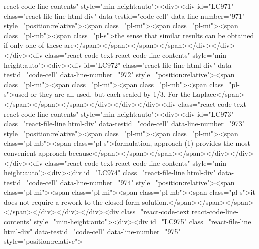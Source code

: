 {{{{{{{{{react-code-line-contents" style="min-height:auto"><div><div id="LC971" class="react-file-line html-div" data-testid="code-cell" data-line-number="971" style="position:relative"><span class="pl-mi"><span class="pl-mi"><span class="pl-mb"><span class="pl-s">the sense that similar results can be obtained if only one of these are</span></span></span></span></div></div></div><div class="react-code-text react-code-line-contents" style="min-height:auto"><div><div id="LC972" class="react-file-line html-div" data-testid="code-cell" data-line-number="972" style="position:relative"><span class="pl-mi"><span class="pl-mi"><span class="pl-mb"><span class="pl-s">used or they are all used, but each scaled by 1/3. For the Laplace</span></span></span></span></div></div></div><div class="react-code-text react-code-line-contents" style="min-height:auto"><div><div id="LC973" class="react-file-line html-div" data-testid="code-cell" data-line-number="973" style="position:relative"><span class="pl-mi"><span class="pl-mi"><span class="pl-mb"><span class="pl-s">formulation, approach (1) provides the most convenient approach because</span></span></span></span></div></div></div><div class="react-code-text react-code-line-contents" style="min-height:auto"><div><div id="LC974" class="react-file-line html-div" data-testid="code-cell" data-line-number="974" style="position:relative"><span class="pl-mi"><span class="pl-mi"><span class="pl-mb"><span class="pl-s">it does not require a rework to the closed-form solution.</span></span></span></span></div></div></div><div class="react-code-text react-code-line-contents" style="min-height:auto"><div><div id="LC975" class="react-file-line html-div" data-testid="code-cell" data-line-number="975" style="position:relative">
}}}}}}}}}
